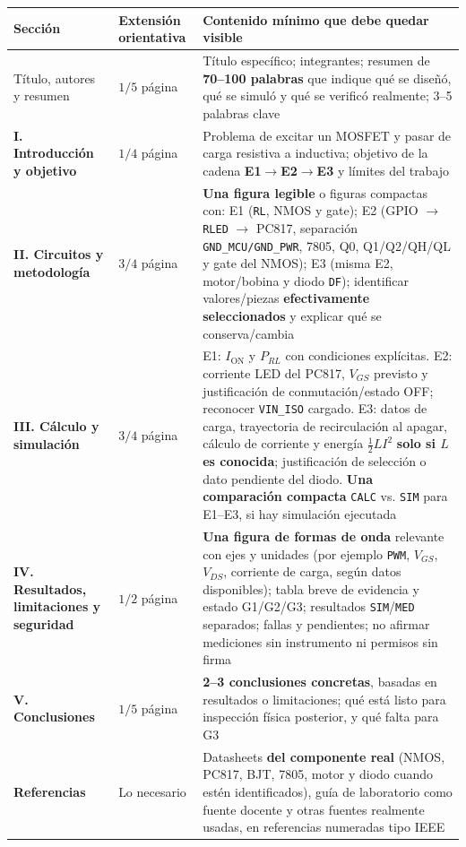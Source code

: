 \documentclass[10pt, a4paper]{article}
\newcommand{\evtag}[1]{\texttt{#1}}
\begin{document}
\noindent\begin{tabularx}{\textwidth}{|>{\hsize=0.55\hsize\raggedright\arraybackslash}X|>{\hsize=0.30\hsize\raggedright\arraybackslash}X|>{\hsize=2.15\hsize\raggedright\arraybackslash}X|}
\hline
\rowcolor{ucbblue!15}
\textbf{Sección} & \textbf{Extensión orientativa} & \textbf{Contenido mínimo que debe quedar visible} \\ \hline
Título, autores y resumen & $1/5$ página & Título específico; integrantes; resumen de \textbf{70--100 palabras} que indique qué se diseñó, qué se simuló y qué se verificó realmente; 3--5 palabras clave \\ \hline
\textbf{I. Introducción y objetivo} & $1/4$ página & Problema de excitar un MOSFET y pasar de carga resistiva a inductiva; objetivo de la cadena \textbf{E1$\to$E2$\to$E3} y límites del trabajo \\ \hline
\textbf{II. Circuitos y metodología} & $3/4$ página & \textbf{Una figura legible} o figuras compactas con: E1 (\texttt{RL}, NMOS y gate); E2 (GPIO $\to$ \texttt{RLED} $\to$ PC817, separación \texttt{GND\_MCU/GND\_PWR}, 7805, Q0, Q1/Q2/QH/QL y gate del NMOS); E3 (misma E2, motor/bobina y diodo \texttt{DF}); identificar valores/piezas \textbf{efectivamente seleccionados} y explicar qué se conserva/cambia \\ \hline
\textbf{III. Cálculo y simulación} & $3/4$ página & E1: $I_{\mathrm{ON}}$ y $P_{RL}$ con condiciones explícitas. E2: corriente LED del PC817, $V_{GS}$ previsto y justificación de conmutación/estado OFF; reconocer \texttt{VIN\_ISO} cargado. E3: datos de carga, trayectoria de recirculación al apagar, cálculo de corriente y energía $\frac{1}{2}LI^2$ \textbf{solo si $L$ es conocida}; justificación de selección o dato pendiente del diodo. \textbf{Una comparación compacta} \evtag{CALC} vs. \evtag{SIM} para E1--E3, si hay simulación ejecutada \\ \hline
\textbf{IV. Resultados, limitaciones y seguridad} & $1/2$ página & \textbf{Una figura de formas de onda} relevante con ejes y unidades (por ejemplo \texttt{PWM}, $V_{GS}$, $V_{DS}$, corriente de carga, según datos disponibles); tabla breve de evidencia y estado G1/G2/G3; resultados \evtag{SIM}/\evtag{MED} separados; fallas y pendientes; no afirmar mediciones sin instrumento ni permisos sin firma \\ \hline
\textbf{V. Conclusiones} & $1/5$ página & \textbf{2--3 conclusiones concretas}, basadas en resultados o limitaciones; qué está listo para inspección física posterior, y qué falta para G3 \\ \hline
\textbf{Referencias} & Lo necesario & Datasheets \textbf{del componente real} (NMOS, PC817, BJT, 7805, motor y diodo cuando estén identificados), guía de laboratorio como fuente docente y otras fuentes realmente usadas, en referencias numeradas tipo IEEE \\ \hline
\end{tabularx}
\endgroup
\end{document}
